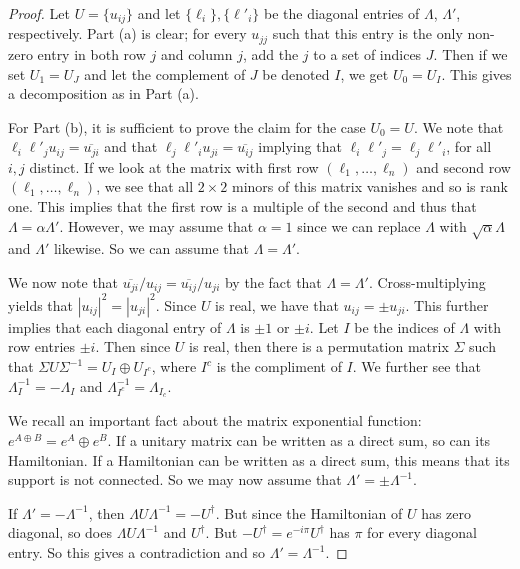 \documentclass[twocolumn,superscriptaddress]{revtex4-1}
\theoremstyle{plain}
\theoremstyle{definition}
\theoremstyle{definition}
\theoremstyle{definition}
\theoremstyle{definition}
\theoremstyle{definition}
\theoremstyle{definition}
\begin{document}
\begin{proof}
 Let $U=\{u_{ij}\}$ and let $\{\ell_i\}, \{\ell'_i\}$ be the diagonal entries of $\Lambda$, $\Lambda'$, respectively. Part (a) is clear; for every $u_{jj}$ such that this entry is the only non-zero entry in both row $j$ and column $j$, add the $j$ to a set of indices $J$. Then if we set $U_1=U_J$ and let the complement of $J$ be denoted $I$, we get $U_0=U_I$. This gives a decomposition as in Part (a). 
 
 For Part (b), it is sufficient to prove the claim for the case $U_0=U$. We note that $\ell_i\ell'_ju_{ij}=\overline{u_{ji}}$ and that $\ell_j\ell'_iu_{ji}=\overline{u_{ij}}$ implying that $\ell_i\ell'_j=\ell_j\ell'_i$, for all $i,j$ distinct. If we look at the matrix with first row $(\ell_1,\dots,\ell_n)$ and second row $(\ell_1,\dots,\ell_n)$, we see that all $2\times 2 $ minors of this matrix vanishes and so is rank one. This implies that the first row is a multiple of the second and thus that $\Lambda=\alpha \Lambda'$. However, we may assume that $\alpha=1$ since we can replace $\Lambda$ with $\sqrt{\alpha}\Lambda$ and $\Lambda'$ likewise. So we can assume that $\Lambda=\Lambda'$.
 
 We now note that $\overline{u_{ji}}/u_{ij}=\overline{u_{ij}}/u_{ji}$ by the fact that $\Lambda=\Lambda'$. Cross-multiplying yields that $|u_{ij}|^2=|u_{ji}|^2$. Since $U$ is real, we have that $u_{ij}=\pm u_{ji}$. This further implies that each diagonal entry of $\Lambda$ is $\pm 1$ or $\pm i$. Let $I$ be the indices of $\Lambda$ with row entries $\pm i$. Then since $U$ is real, then there is a permutation matrix $\Sigma$ such that $\Sigma U\Sigma^{-1}=U_I\oplus U_{I^c}$, where $I^c$ is the compliment of $I$. We further see that $\Lambda_I^{-1}=-\Lambda_I$ and $\Lambda_{I^c}^{-1}=\Lambda_{I_c}$.

 
 We recall an important fact about the matrix exponential function: $e^{A\oplus B}=e^A\oplus e^B$. If a unitary matrix can be written as a direct sum, so can its Hamiltonian. If a Hamiltonian can be written as a direct sum, this means that its support is not connected. So we may now assume that $\Lambda'=\pm \Lambda^{-1}$. 
 
 If $\Lambda'=-\Lambda^{-1}$, then $\Lambda U\Lambda^{-1}=-U^\dagger$. But since the Hamiltonian of $U$ has zero diagonal, so does $\Lambda U\Lambda^{-1}$ and $U^\dagger$. But $-U^\dagger=e^{-i\pi} U^\dagger$ has $\pi$ for every diagonal entry. So this gives a contradiction and so $\Lambda'=\Lambda^{-1}$.
\end{proof}
\end{document}
